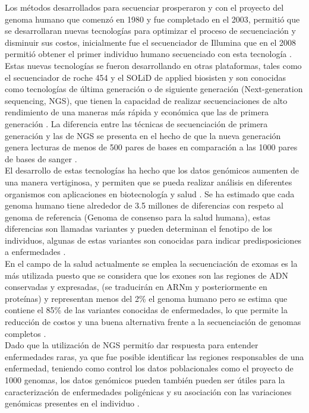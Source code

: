 Los métodos desarrollados para secuenciar prosperaron y con el proyecto del genoma humano que comenzó en 1980 y fue completado en el 2003, permitió que se desarrollaran nuevas tecnologías para optimizar el proceso de secuenciación y disminuir sus costos, inicialmente fue el secuenciador de Illumina  que en el 2008 permitió obtener el primer individuo humano secuenciado con esta tecnología \cite{Pei}. Estas nuevas tecnologías se fueron desarrollando en otras plataformas, tales como el secuenciador de roche 454 y el SOLiD de applied biosisten \cite{Pei} y son conocidas como tecnologías de última generación o de siguiente generación (Next-generation sequencing, NGS), que tienen la capacidad de realizar secuenciaciones de alto rendimiento de una maneras más rápida y económica que las de primera generación \cite{Herraez2012}. La diferencia entre las técnicas de secuenciación de primera generación y las de NGS se presenta en el hecho de que la nueva generación genera lecturas de menos de 500 pares de bases en comparación a las 1000 pares de bases de sanger \cite{Pei,Kulski2016}. \\
 
El desarrollo de estas tecnologías ha hecho que los datos genómicos aumenten de una manera vertiginosa, y permiten que se pueda realizar análisis en diferentes organismos con aplicaciones en biotecnología y salud \cite{Herraez2012}. Se ha estimado que cada genoma humano tiene alrededor de 3.5 millones de diferencias con respeto al genoma de referencia (Genoma de consenso para la salud humana), estas diferencias son llamadas variantes y pueden determinan el fenotipo de los individuos, algunas de estas variantes son conocidas para indicar predisposiciones a enfermedades \cite{Kutzera2017}.\\

En el campo de la salud actualmente se emplea la secuenciación de exomas es la más utilizada puesto que se considera que los exones son las regiones de ADN conservadas y expresadas, (se traducirán en ARNm y posteriormente en proteínas) y representan menos del 2\% el genoma humano pero se estima que contiene el 85\% de las variantes conocidas de enfermedades, lo que permite la reducción de costos y una buena alternativa frente a la secuenciación de genomas completos \cite{Illumina2017,Klug2013,Herraez2012}.\\

Dado que la utilización de NGS permitío dar respuesta para entender enfermedades raras, ya que fue posible identificar las regiones responsables de una enfermedad, teniendo como control los datos poblacionales como el proyecto de 1000 genomas, los datos genómicos pueden también pueden ser útiles para la caracterización de enfermedades poligénicas y su asociación con las variaciones genómicas presentes en el individuo \cite{Poliakov2015}.\\

